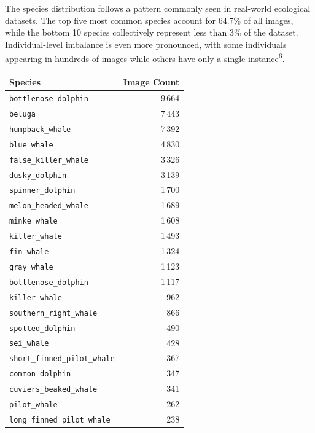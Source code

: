 \documentclass[twocolumn]{article}
\begin{document}
The species distribution follows a pattern commonly seen in real-world ecological datasets. The top five most common species account for 64.7\% of all images, while the bottom 10 species collectively represent less than 3\% of the dataset. Individual-level imbalance is even more pronounced, with some individuals appearing in hundreds of images while others have only a single instance\textsuperscript{6}. 

\begin{table}[ht]
\centering
\begin{tabular}{l r}
\hline
\textbf{Species} & \textbf{Image Count} \\
\hline
\texttt{bottlenose\_dolphin}           & 9\,664 \\
\texttt{beluga}                        & 7\,443 \\
\texttt{humpback\_whale}               & 7\,392 \\
\texttt{blue\_whale}                   & 4\,830 \\
\texttt{false\_killer\_whale}          & 3\,326 \\
\texttt{dusky\_dolphin}                & 3\,139 \\
\texttt{spinner\_dolphin}              & 1\,700 \\
\texttt{melon\_headed\_whale}          & 1\,689 \\
\texttt{minke\_whale}                  & 1\,608 \\
\texttt{killer\_whale}                 & 1\,493 \\
\texttt{fin\_whale}                    & 1\,324 \\
\texttt{gray\_whale}                   & 1\,123 \\
\texttt{bottlenose\_dolphin}            & 1\,117 \\
\texttt{killer\_whale}                  &   962 \\
\texttt{southern\_right\_whale}        &   866 \\
\texttt{spotted\_dolphin}              &   490 \\
\texttt{sei\_whale}                    &   428 \\
\texttt{short\_finned\_pilot\_whale}   &   367 \\
\texttt{common\_dolphin}               &   347 \\
\texttt{cuviers\_beaked\_whale}        &   341 \\
\texttt{pilot\_whale}                  &   262 \\
\texttt{long\_finned\_pilot\_whale}    &   238 \\

\end{tabular}
\end{table}
\end{document}
